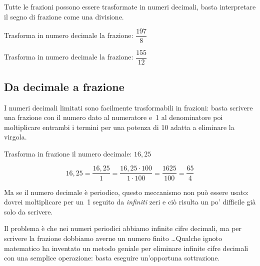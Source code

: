 Tutte le frazioni possono essere trasformate in numeri decimali, basta
interpretare il segno di frazione come una divisione.

\begin{esempio}
Trasforma in numero decimale la frazione: \(\dfrac{197}{8}\)
\begin{center}
 \begin{center}\end{center}
\end{center}
\end{esempio}

\begin{esempio}
Trasforma in numero decimale la frazione: \(\dfrac{155}{12}\)
\begin{center}
 \begin{center}\end{center}
\end{center}
\end{esempio}

\subsection{Da decimale a frazione}

I numeri decimali limitati sono facilmente trasformabili in frazioni: basta
scrivere una frazione con il numero dato al numeratore e~1 al denominatore
poi moltiplicare entrambi i termini per una potenza di 10 adatta a
eliminare la virgola.

\begin{esempio}
Trasforma in frazione il numero decimale: \(16,25\)
\begin{center}
 \[16,25 = \frac{16,25}{1} = \frac{16,25 \cdot 100}{1 \cdot 100} =
   \frac{1625}{100} = \frac{65}{4}\]
\end{center}
\end{esempio}

Ma se il numero decimale è periodico, questo meccanismo non può essere
usato: dovrei moltiplicare per un~1 seguito da \emph{infiniti} zeri e ciò
risulta un po' difficile già solo da scrivere.

Il problema è che nei numeri periodici abbiamo infinite cifre decimali, ma
per scrivere la frazione dobbiamo averne un numero finito \dots Qualche
ignoto matematico ha inventato un metodo geniale per eliminare infinite
cifre decimali con una semplice operazione: basta eseguire un'opportuna
sottrazione.

